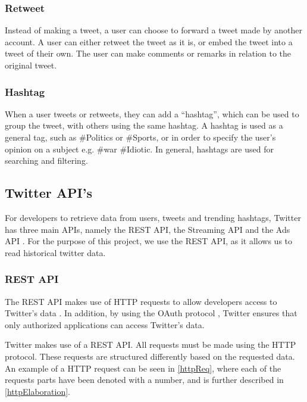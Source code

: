 \subsubsection{Retweet}
Instead of making a tweet, a user can choose to forward a tweet made by another
account. A user can either retweet the tweet as it is, or embed the tweet into a
tweet of their own. The user can make comments or remarks in relation to the
original tweet.

\subsubsection{Hashtag}
When a user tweets or retweets, they can add a ``hashtag'', which can be used to
group the tweet, with others using the same hashtag. A hashtag is used as a
general tag, such as \#Politics or \#Sports, or in order to specify the user's
opinion on a subject e.g. \#war \#Idiotic. In general, hashtags are used for
searching and filtering.

\subsection{Twitter API's}
For developers to retrieve data from users, tweets and trending hashtags,
Twitter has three main \acp{API}, namely the \ac{REST} \ac{API}, the Streaming
\ac{API} and the Ads \ac{API} \citep{TwitterDevDocs}. For the purpose of this
project, we use the \ac{REST} \ac{API}, as it allows us to read historical twitter
data.

\subsubsection{REST API}
The \ac{REST} \ac{API} makes use of \ac{HTTP} requests to allow developers access to
Twitter's data \citep{TwitterREST}. In addition, by using the OAuth protocol
\citep{TwitterOAuth}, Twitter ensures that only authorized applications can
access Twitter's data.\nl

Twitter makes use of a \ac{REST} \ac{API}. All requests must be made using the
\ac{HTTP} protocol. These requests are structured differently based on the
requested data. An example of a \ac{HTTP} request can be seen in
\autoref{httpReq}, where each of the requests parts have been denoted with a
number, and is further described in \autoref{httpElaboration}.


